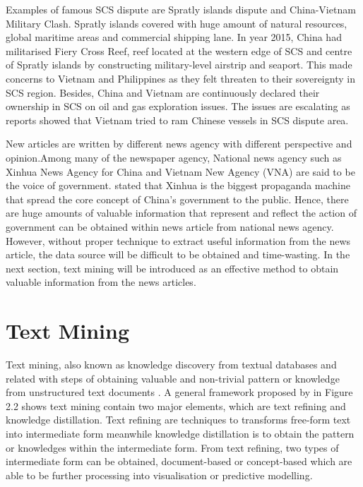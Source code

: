 \documentclass[twoside]{utmthesis}
\begin{document}
Examples of famous SCS dispute are Spratly islands dispute and China-Vietnam Military Clash. Spratly islands covered with huge amount of natural resources, global maritime areas and commercial shipping lane. In year 2015, China had militarised Fiery Cross Reef, reef located at the western edge of SCS and centre of Spratly islands by constructing military-level airstrip and seaport. This made concerns to Vietnam and Philippines as they felt threaten to their sovereignty in SCS region. Besides, China and Vietnam are continuously declared their ownership in SCS on oil and gas exploration issues. The issues are escalating as reports \citep{vietnamBoat2014} showed that Vietnam tried to ram Chinese vessels in SCS dispute area.     
 
New articles are written by different news agency with different perspective and opinion.Among many of the newspaper agency, National news agency such as Xinhua News Agency for China and Vietnam New Agency (VNA) are said to be the voice of government. \cite{gautierbattistellaOctober2005} stated that Xinhua is the biggest propaganda machine that spread the core concept of China's government to the public. Hence, there are huge amounts of valuable information that represent and reflect the action of government can be obtained within  news article from national news agency. However, without proper technique to extract useful information from the news article, the data source will be difficult to be obtained and time-wasting. In the next section, text mining will be introduced as an effective method to obtain valuable information from the news articles.   


\section{Text Mining}
Text mining, also known as knowledge discovery from textual databases and related with steps of obtaining valuable and non-trivial pattern or knowledge from unstructured text documents \citep{tan1999text}. A general framework proposed by \cite{tan1999text} in Figure 2.2 shows text mining contain two major elements, which are text refining and knowledge distillation. Text refining are techniques to transforms free-form text into intermediate form meanwhile knowledge distillation is to obtain the pattern or knowledges within the intermediate form. From text refining, two types of intermediate form can be obtained, document-based or concept-based which are able to be further processing into visualisation or predictive modelling.   
\end{document}
